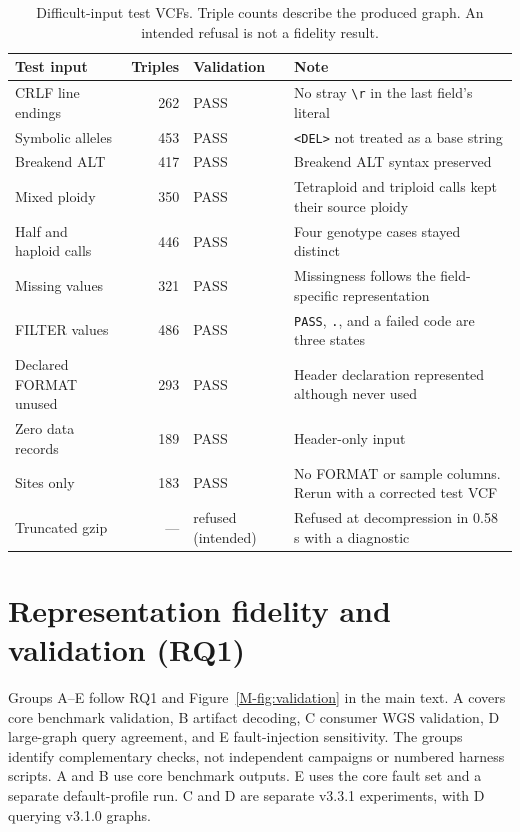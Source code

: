 \documentclass[11pt]{article}
\begin{document}
\begin{table}[!htbp]
\caption{Difficult-input test VCFs.
Triple counts describe the produced graph.
An intended refusal is not a fidelity result.}\label{tab:difficult-inputs}%
\centering\footnotesize\setlength{\tabcolsep}{4pt}\renewcommand{\arraystretch}{1.1}%
\begin{tabularx}{\textwidth}{@{}l r l >{\raggedright\arraybackslash}X@{}}
\toprule
\textbf{Test input} & \textbf{Triples} & \textbf{Validation} & \textbf{Note}\\
\midrule
CRLF line endings & 262 & PASS & No stray \texttt{\textbackslash r} in the last field's literal\\
Symbolic alleles & 453 & PASS & \texttt{<DEL>} not treated as a base string\\
Breakend ALT & 417 & PASS & Breakend ALT syntax preserved\\
Mixed ploidy & 350 & PASS & Tetraploid and triploid calls kept their source ploidy\\
Half and haploid calls & 446 & PASS & Four genotype cases stayed distinct\\
Missing values & 321 & PASS & Missingness follows the field-specific representation\\
FILTER values & 486 & PASS & \texttt{PASS}, \texttt{.}, and a failed code are three states\\
Declared FORMAT unused & 293 & PASS & Header declaration represented although never used\\
Zero data records & 189 & PASS & Header-only input\\
Sites only & 183 & PASS & No FORMAT or sample columns.
Rerun with a corrected test VCF\\
\midrule
Truncated gzip & --- & refused (intended) & Refused at decompression in 0.58\,s with a diagnostic\\
\bottomrule
\end{tabularx}
\end{table}

\section{Representation fidelity and validation (RQ1)}\label{sec:validation}
Groups A--E follow RQ1 and Figure~\ref{M-fig:validation} in the main text.
A covers core benchmark validation, B artifact decoding, C consumer WGS validation, D large-graph query agreement, and E fault-injection sensitivity.
The groups identify complementary checks, not independent campaigns or numbered harness scripts.
A and B use core benchmark outputs.
E uses the core fault set and a separate default-profile run.
C and D are separate v3.3.1 experiments, with D querying v3.1.0 graphs.
\end{document}
